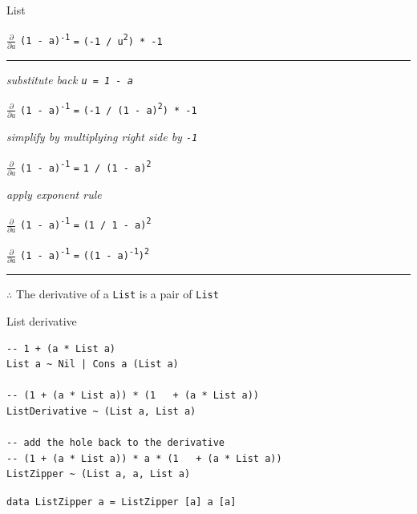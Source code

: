 \begin{frame}{List}

$\frac{\partial}{\partial a}$ {\lstinline{(1 - a)}\textsuperscript{\lstinline{-1}}} \lstinline{=} \lstinline{(-1 / u}\textsuperscript{\lstinline{2}}\lstinline{) * -1}

\par\noindent\rule{\textwidth}{0.4pt}

\emph{\tiny{substitute back \lstinline{u = 1 - a}}}

$\frac{\partial}{\partial a}$ {\lstinline{(1 - a)}\textsuperscript{\lstinline{-1}}} \lstinline{=} \lstinline{(-1 / (1 - a)}\textsuperscript{\lstinline{2}}\lstinline{) * -1}

\emph{\tiny{simplify by multiplying right side by \lstinline{-1}}}

$\frac{\partial}{\partial a}$ {\lstinline{(1 - a)}\textsuperscript{\lstinline{-1}}} \lstinline{=} \lstinline{1 / (1 - a)}\textsuperscript{\lstinline{2}}

\emph{\tiny{apply exponent rule}}

$\frac{\partial}{\partial a}$ {\lstinline{(1 - a)}\textsuperscript{\lstinline{-1}}} \lstinline{=} \lstinline{(1 / 1 - a)}\textsuperscript{\lstinline{2}}

$\frac{\partial}{\partial a}$ {\lstinline{(1 - a)}\textsuperscript{\lstinline{-1}}} \lstinline{=} \lstinline{((1 - a)}\textsuperscript{\lstinline{-1}}\lstinline{)}\textsuperscript{\lstinline{2}}

\par\noindent\rule{\textwidth}{0.4pt}

{$\therefore$} The derivative of a \lstinline{List} is a pair of \lstinline{List}

\end{frame}


\begin{frame}[fragile]
\begin{block}{List derivative}
\begin{lstlisting}[style=haskell]
-- 1 + (a * List a)
List a ~ Nil | Cons a (List a)

-- (1 + (a * List a)) * (1   + (a * List a))
ListDerivative ~ (List a, List a)

-- add the hole back to the derivative
-- (1 + (a * List a)) * a * (1   + (a * List a))
ListZipper ~ (List a, a, List a)
\end{lstlisting}
\end{block}
\end{frame}


\begin{frame}
\begin{center}
\lstinline{data ListZipper a = ListZipper [a] a [a]}
\end{center}
\end{frame}

